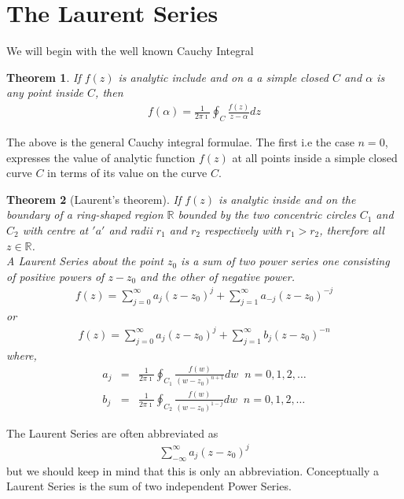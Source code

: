 \documentclass[12pt]{report}
\newcommand{\sps}{\\[0.2cm]}
\newcommand{\real}{ \mathbb{R}}
\newcommand{\imaginary}{\imath}
\newtheorem{theorem}{Theorem}[chapter]
\begin{document}
	\section{The Laurent Series}
	We will begin with the well known Cauchy Integral
	\begin{theorem}
		If $f(z)$ is analytic include and on a a simple closed $C$ and $\alpha$ is any point inside $C$, then
		\begin{eqnarray}
			f(\alpha) = \frac{1}{2\pi\imaginary}\oint_C\frac{f(z)}{z-\alpha}dz
		\end{eqnarray}
	\end{theorem}
	The above is the general Cauchy integral formulae. The first i.e the case $n=0$, expresses the value of analytic function $f(z)$ at all points inside a simple closed curve $C$ in terms of its value on the curve $C$.
	
	\begin{theorem}[Laurent's theorem]
		If $f(z)$ is analytic inside and on the boundary of a ring-shaped region $\real$ bounded by the two concentric circles $C_1$ and $C_2$ with centre at $'a'$ and radii $r_1$ and $r_2$ respectively with $r_1 > r_2$, therefore all $z\in\real$.\\
		A Laurent Series about the point $z_0$ is a sum of two power series one consisting of positive powers of $z-z_0$ and the other of negative power.
		\begin{eqnarray*}
			f(z) = \sum_{j=0}^{\infty}a_j(z-z_0)^j + \sum_{j=1}^{\infty}a_{-j}(z-z_0)^{-j}
		\end{eqnarray*}
		or
		\begin{eqnarray*}
			f(z) = \sum_{j=0}^{\infty}a_j(z-z_0)^j + \sum_{j=1}^{\infty}b_j(z-z_0)^{-n}
		\end{eqnarray*}
		where,
		\begin{eqnarray*}
			a_j &=& \frac{1}{2\pi\imaginary}\oint_{C_1}\frac{f(w)}{(w-z_0)^{n+1}}dw\;\; n=0,1,2,\ldots\sps
			b_j &=& \frac{1}{2\pi\imaginary}\oint_{C_2}\frac{f(w)}{(w-z_0)^{1-j}}dw\;\; n=0,1,2,\ldots
		\end{eqnarray*}
	\end{theorem}
	The Laurent Series are often abbreviated as 
	\begin{eqnarray}
		\sum_{-\infty}^{\infty} a_j(z-z_0)^j
	\end{eqnarray}
	but we should keep in mind that this is only an abbreviation. Conceptually a Laurent Series is the sum of two independent Power Series.\\
	
\end{document}
